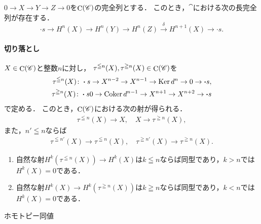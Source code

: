 \begin{Proposition}
    $0\to X\to Y\to Z\to 0$を$\mathop{\mathrm{C}}\nolimits(\mathscr{C})$の完全列とする．
    このとき，$\cat$における次の長完全列が存在する．
    \begin{equation*}
        \boldsymbol{\cdot}s\to 
        H^{n}(X)\to H^{n}(Y)\to H^{n}(Z)
        \overset{\delta}{\longrightarrow} 
        H^{n+1}(X)\to \boldsymbol{\cdot}s.
    \end{equation*}
\end{Proposition}

\paragraph*{切り落とし}
$X\in\mathop{\mathrm{C}}\nolimits(\mathscr{C})$と整数$n$に対し，
$\tau^{\leqq n}(X),\tau^{\geqq n}(X)\in\mathop{\mathrm{C}}\nolimits(\mathscr{C})$を
\begin{align}
    \tau^{\leqq n}(X)\colon 
    \boldsymbol{\cdot}s\to X^{n-2}\to X^{n-1}\to \mathop{\mathrm{Ker}}\nolimits{d^n}\to0\to\boldsymbol{\cdot}s,\\
    \tau^{\geqq n}(X)\colon 
    \boldsymbol{\cdot}s 0\to \mathop{\mathrm{Coker}}\nolimits{d^{n-1}}\to X^{n+1}\to X^{n+2}\to\boldsymbol{\cdot}s
\end{align}
で定める．
このとき，$\mathop{\mathrm{C}}\nolimits(\mathscr{C})$における次の射が得られる．
\begin{align*}
    \tau^{\leqq n}(X)\to X,\quad X\to\tau^{\geqq n}(X),
\end{align*}
また，$n'\leqq n$ならば
\begin{align*}
    \tau^{\leqq n'}(X)\to \tau^{\leqq n}(X),
    \quad 
    \tau^{\geqq n'}(X)\to\tau^{\geqq n}(X).
\end{align*}

\begin{Proposition}
    \begin{enumerate}
        \item 自然な射$H^k(\tau^{\leqq n}(X))\to H^k(X)$は$k\leqq n$ならば同型であり，$k>n$では$H^k(X)=0$である．
        \item 自然な射$H^k(X)\to H^k(\tau^{\geqq n}(X))$は$k\geqq n$ならば同型であり，$k<n$では$H^k(X)=0$である．
    \end{enumerate}
\end{Proposition}

\begin{Attention}
    ホモトピー同値    
\end{Attention}

